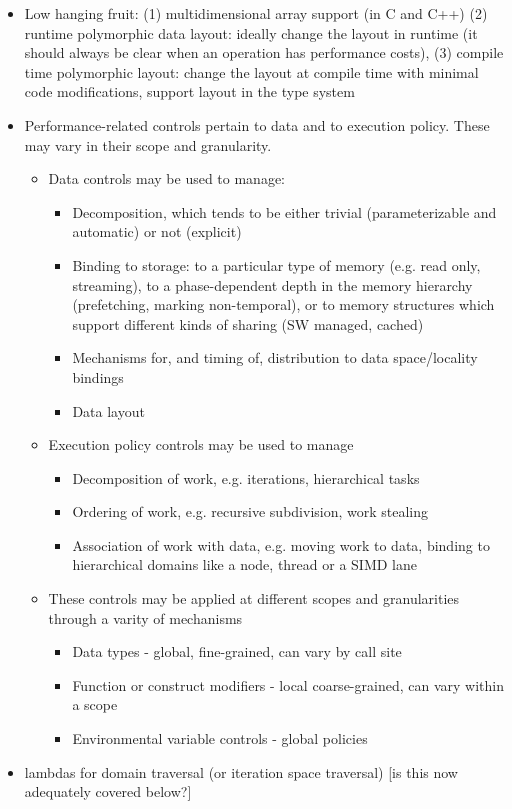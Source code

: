 \begin{itemize}
\begin{itemize}
  \item Low hanging fruit: 
    (1) multidimensional array support (in C and C++) 
    (2) runtime polymorphic data layout: 
    ideally change the layout in runtime (it should always be clear when an operation has performance costs),
    (3) compile time polymorphic layout: change the layout at compile time with minimal code modifications, 
    support layout in the type system 
  \item Performance-related controls pertain to data and to execution policy.  These may vary in their scope and granularity.
    \begin{itemize}
    \item Data controls may be used to manage:
      \begin{itemize} 
      \item Decomposition, which tends to be either trivial (parameterizable and automatic) or not (explicit)
      \item Binding to storage: to a particular type of memory (e.g. read only, streaming), to a phase-dependent depth in the memory hierarchy (prefetching, marking non-temporal), or to memory structures which support different kinds of sharing (SW managed, cached)
      \item Mechanisms for, and timing of, distribution to data space/locality bindings
      \item Data layout
      \end{itemize}
    \item Execution policy controls may be used to manage
      \begin{itemize} 
      \item Decomposition of work, e.g. iterations, hierarchical tasks
      \item Ordering of work, e.g. recursive subdivision, work stealing
      \item Association of work with data, e.g. moving work to data, binding to hierarchical domains like a node, thread or a SIMD lane
      \end{itemize}
    \item These controls may be applied at different scopes and granularities through a varity of mechanisms
      \begin{itemize} 
      \item Data types - global, fine-grained, can vary by call site
      \item Function or construct modifiers - local coarse-grained, can vary within a scope
      \item Environmental variable controls - global policies
      \end{itemize}
    \end{itemize}
  \item lambdas for domain traversal (or iteration space traversal) [is this now adequately covered below?]
  \end{itemize}
  

\end{itemize}
